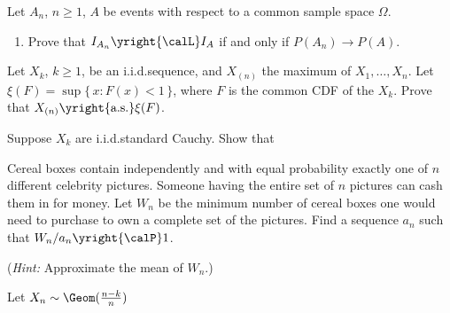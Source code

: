 \begin{problem}[DasGupta 7.5 (a)]
  Let \(A_n\), \(n\geq 1\), \(A\) be events with respect to a common sample
  space \(\Omega\).
  \begin{enumerate}[label=(\alph*),noitemsep]
  \item Prove that \(I_{A_n}\yright{\calL} I_A\) if and only if \(P(A_n)\to
    P(A)\).
  \end{enumerate}
\end{problem}
\begin{solution}

\end{solution}
\newpage

\begin{problem}
  Let \(X_k\), \(k\geq 1\), be an i.i.d.\@ sequence, and \(X_{(n)}\) the
  maximum of \(X_1,\dotsc,X_n\). Let \(\xi(F)=\sup\{\,x:F(x)<1\,\}\), where
  \(F\) is the common CDF of the \(X_k\). Prove that
  \(X_{(n)}\yright{\text{a.s.}}\xi(F)\).
\end{problem}
\begin{solution}

\end{solution}
\newpage

\begin{problem}[DasGupta 7.14 (a)]
  Suppose \(X_k\) are i.i.d.\@ standard Cauchy. Show that
\end{problem}
\begin{solution}

\end{solution}
\newpage

\begin{problem}
  Cereal boxes contain independently and with equal probability exactly one
  of \(n\) different celebrity pictures. Someone having the entire set of
  \(n\) pictures can cash them in for money. Let \(W_n\) be the minimum
  number of cereal boxes one would need to purchase to own a complete set
  of the pictures. Find a sequence \(a_n\) such that
  \(W_n/a_n\yright{\calP} 1\).

  \noindent (\emph{Hint:} Approximate the mean of \(W_n\).)
\end{problem}
\begin{solution}
  Let \(X_n\sim\Geom(\frac{n-k}{n})\)
\end{solution}
\newpage

